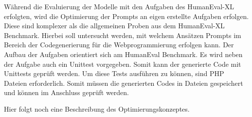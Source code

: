 Während die Evaluierung der Modelle mit den Aufgaben des HumanEval-XL erfolgten, wird die Optimierung der Prompts an eigen erstellte Aufgaben erfolgen. Diese sind komplexer als die allgemeinen Proben aus dem HumanEval-XL Benchmark. Hierbei soll untersucht werden, mit welchem Ansätzen Prompts im Bereich der Codegenerierung für die Webprogrammierung erfolgen kann. Der Aufbau der Aufgaben orientiert sich am HumanEval Benchmark. Es wird neben der Aufgabe auch ein Unittest vorgegeben. Somit kann der generierte Code mit Unittests geprüft werden. Um diese Tests ausführen zu können, sind PHP Dateien erforderlich. Somit müssen die generierten Codes in Dateien gespeichert und können im Anschluss geprüft werden.

\begin{tcolorbox}[
	enhanced,
	colback=red!5!white,
	colframe=red!75!black!50,
	title= Mein roter Faden
	]
	Hier folgt noch eine Beschreibung des Optimierungskonzeptes.
\end{tcolorbox}





